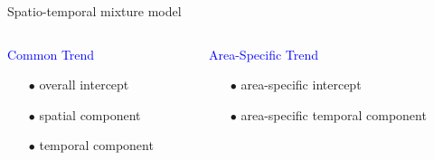 \documentclass[slidestop,compress,serif,10pt]{beamer}
\begin{document}
\begin{frame}{Spatio-temporal mixture model}
\begin{columns}
\begin{column}[T]{0.37\textwidth}
\textcolor{blue}{Common Trend}
\begin{itemize}
\item[$\bullet$] overall intercept
\item[$\bullet$]  spatial component
\item[$\bullet$]  temporal component
\end{itemize}
\end{column}
\begin{column}[T]{0.4\textwidth}
\textcolor{blue}{Area-Specific Trend}
\begin{itemize}
\item[$\bullet$]  area-specific intercept
\item[$\bullet$] area-specific temporal component
\end{itemize}
\end{column}
\end{columns}

\vspace{5pt}\fontsize{7}{7}
\end{frame}
\end{document}
